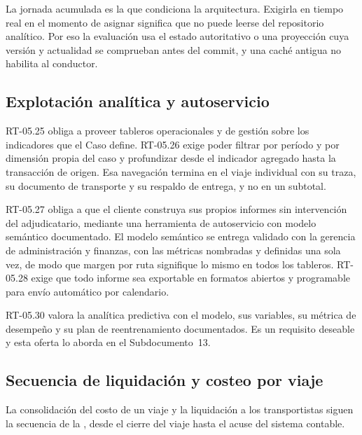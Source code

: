 La jornada acumulada es la que condiciona la arquitectura. Exigirla en tiempo real en el momento de
asignar significa que no puede leerse del repositorio analítico. Por eso la evaluación usa el estado
autoritativo o una proyección cuya versión y actualidad se comprueban antes del commit, y una caché
antigua no habilita al conductor.

\subsection{Explotación analítica y autoservicio}\label{sec:4-autoservicio}

RT-05.25 obliga a proveer tableros operacionales y de gestión sobre los indicadores que el Caso define.
RT-05.26 exige poder filtrar por período y por dimensión propia del caso y profundizar desde el
indicador agregado hasta la transacción de origen. Esa navegación termina en el viaje individual con su
traza, su documento de transporte y su respaldo de entrega, y no en un subtotal.

RT-05.27 obliga a que el cliente construya sus propios informes sin intervención del adjudicatario,
mediante una herramienta de autoservicio con modelo semántico documentado. El modelo semántico se
entrega validado con la gerencia de administración y finanzas, con las métricas nombradas y definidas
una sola vez, de modo que margen por ruta signifique lo mismo en todos los tableros. RT-05.28 exige que
todo informe sea exportable en formatos abiertos y programable para envío automático por calendario.

RT-05.30 valora la analítica predictiva con el modelo, sus variables, su métrica de desempeño y su plan
de reentrenamiento documentados. Es un requisito deseable y esta oferta lo aborda en el
Subdocumento~13.

\subsection{Secuencia de liquidación y costeo por viaje}\label{sec:4-liquidacion}

La consolidación del costo de un viaje y la liquidación a los transportistas siguen la secuencia de la
, desde el cierre del viaje hasta el acuse del sistema contable.


